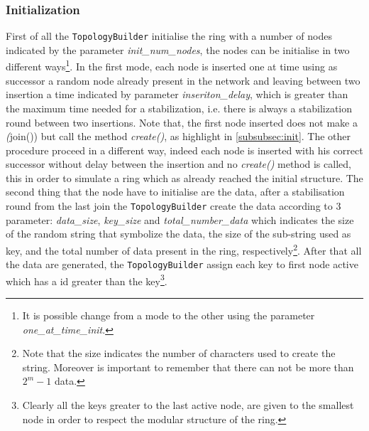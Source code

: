 \documentclass[11pt,twocolumn,letterpaper]{article}
\begin{document}
	\subsubsection{Initialization}
	\label{subsubsec:top-init}
	First of all the \texttt{TopologyBuilder} initialise the ring with a number of nodes indicated by the parameter \textit{init\_num\_nodes}, the nodes can be initialise in two different ways\footnote{It is possible change from a mode to the other using the parameter \textit{one\_at\_time\_init}.}. In the first mode, each node is inserted one at time using as successor a random node already present in the network and leaving between two insertion a time indicated by parameter \textit{inseriton\_delay}, which is greater than the maximum time needed for a stabilization, i.e. there is always a stabilization round between two insertions. Note that, the first node inserted does not make a \textit(join()) but call the method \textit{create()}, as highlight in \cref{subsubsec:init}. The other procedure proceed in a different way, indeed each node is inserted with his correct successor without delay between the insertion and no \textit{create()} method is called, this in order to simulate a ring which as already reached the initial structure.
	The second thing that the node have to initialise are the data, after a stabilisation round from the last join the \texttt{TopologyBuilder} create the data according to 3 parameter: \textit{data\_size}, \textit{key\_size} and \textit{total\_number\_data} which indicates the size of the random string that symbolize the data, the size of the sub-string used as key, and the total number of data present in the ring, respectively\footnote{Note that the size indicates the number of characters used to create the string. Moreover is important to remember that there can not be more than $2^m -1$ data.}. After that all the data are generated, the \texttt{TopologyBuilder} assign each key to first node active which has a id greater than the key\footnote{Clearly all the keys greater to the last active node, are given to the smallest node in order to respect the modular structure of the ring.}.
	
\end{document}
